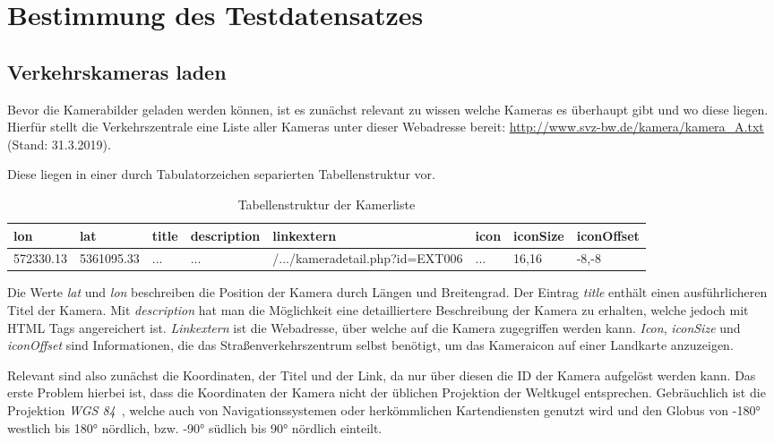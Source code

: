 \section{Bestimmung des Testdatensatzes}
\subsection{Verkehrskameras laden}
\label{sec:AnaCam}
Bevor die Kamerabilder geladen werden können, ist es zunächst relevant zu wissen welche Kameras es überhaupt gibt und wo diese liegen.
Hierfür stellt die Verkehrszentrale eine Liste aller Kameras unter dieser Webadresse bereit: \url{http://www.svz-bw.de/kamera/kamera_A.txt} (Stand: 31.3.2019).

Diese liegen in einer durch Tabulatorzeichen separierten Tabellenstruktur vor.

\begin{table}[ht]
  \centering
\scriptsize
    \begin{tabular}{ | l | l | l | l | l | l | l | l |}
    \hline
		lon & lat & title & description & linkextern & icon & iconSize & iconOffset \\ \hline
    572330.13 &
		5361095.33 &
		... &
		... &
		/.../kameradetail.php?id=EXT006 &
		... &
		16,16 &
		-8,-8 \\
    \hline
    \end{tabular}
		\caption{Tabellenstruktur der Kamerliste}
\end{table}

Die Werte {\em lat} und {\em lon} beschreiben die Position der Kamera durch Längen und Breitengrad.
Der Eintrag {\em title} enthält einen ausführlicheren Titel der Kamera. Mit {\em description} hat man die Möglichkeit eine detailliertere Beschreibung der Kamera zu erhalten, welche jedoch mit HTML Tags angereichert ist. {\em Linkextern} ist die Webadresse, über welche auf die Kamera zugegriffen werden kann. {\em Icon}, {\em iconSize} und {\em iconOffset} sind Informationen, die das Straßenverkehrszentrum selbst benötigt, um das Kameraicon auf einer Landkarte anzuzeigen.

Relevant sind also zunächst die Koordinaten, der Titel und der Link, da nur über diesen die ID der Kamera aufgelöst werden kann.
Das erste Problem hierbei ist, dass die Koordinaten der Kamera nicht der üblichen Projektion der Weltkugel entsprechen. Gebräuchlich ist die Projektion {\em WGS 84}~\cite{wgs84}, welche auch von Navigationssystemen oder herkömmlichen Kartendiensten genutzt wird und den Globus von -180° westlich bis 180° nördlich, bzw. -90° südlich bis 90° nördlich einteilt.

